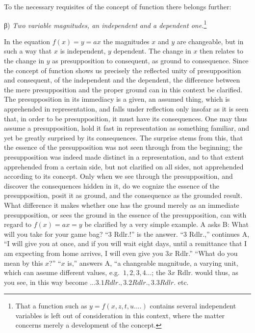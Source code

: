 \documentclass[12pt,a4paper,openany]{book}
\newcommand{\opage}[1]{\marginnote{\footnotesize\textit{[#1]}}}
\begin{document}
To the necessary requisites of the concept of function there belongs further:

\begin{center}β) \emph{Two variable magnitudes, an independent and a dependent one.}\footnote[2]{That a function such as $y=f(x, z, t, u....)$ contains several independent variables is left out of consideration in this context, where the matter concerns merely a development of the concept.}\end{center}

In the equation $f(x)=y=ax$ the magnitudes $x$ and $y$ are changeable, but in such a way that $x$ is independent, $y$ dependent.
The change in $x$ then relates to the change in $y$ as
presupposition to consequent, as ground to consequence. Since the
concept of function shows us precisely the reflected unity of presupposition and consequent,
of the independent and the dependent, the difference between the mere presupposition and
the proper ground can in this context be clarified. The
\setcounter{footnote}{0}%
\opage{8}presupposition in its immediacy is a given, an assumed thing,
which is apprehended in representation, and falls under
reflection only insofar as it is seen that, in order to be presupposition,
it must have its consequences. One may thus assume
a presupposition, hold it fast in representation as
something familiar, and yet be greatly surprised by its
consequences. The surprise stems from this, that the essence of the presupposition
was not seen through from the beginning;
the presupposition was indeed made distinct in a representation, and
to that extent apprehended from a certain side, but not clarified on all sides,
not apprehended according to its concept. Only when we see through the
presupposition, and discover the consequences hidden in it,
do we cognize the essence of the presupposition, posit it as
ground, and the consequence as the grounded result. What
difference it makes whether one has the ground merely as an immediate
presupposition, or sees the ground in the essence of the presupposition,
can with regard to $f(x)=ax=y$ be clarified
by a very simple example. A asks B: What will you
take for your game bag? ``3 Rdlr.!'' is the answer. ``3 Rdlr.,''
continues A, ``I will give you at once, and if you will wait
eight days, until a remittance that I am expecting from
home arrives, I will even give you $3 x$ Rdlr.''
``What do you mean by this $x$?'' ``$x$ is,'' answers A, ``a
changeable magnitude, a varying unit, which can assume
different values, e.g.\ $1, 2, 3, 4 ...$; the $3 x$ Rdlr. would thus, as you see, in this way
become $... 3. 1 Rdlr., 3. 2 Rdlr., 3. 3 Rdlr.$ etc.
\end{document}
